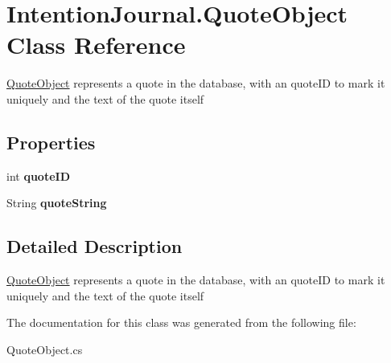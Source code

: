 \hypertarget{class_intention_journal_1_1_quote_object}{}\section{Intention\+Journal.\+Quote\+Object Class Reference}
\label{class_intention_journal_1_1_quote_object}


\hyperlink{class_intention_journal_1_1_quote_object}{Quote\+Object} represents a quote in the database, with an quote\+ID to mark it uniquely and the text of the quote itself  


\subsection*{Properties}
\begin{DoxyCompactItemize}
\item 
\mbox{\label{class_intention_journal_1_1_quote_object_acd7fa876ccb11b2f43ffe8f2616bc7ed}} 
int {\bfseries quote\+ID}
\item 
\mbox{\label{class_intention_journal_1_1_quote_object_a96f7ae5ecf61d428144f66fed8d75933}} 
String {\bfseries quote\+String}
\end{DoxyCompactItemize}


\subsection{Detailed Description}
\hyperlink{class_intention_journal_1_1_quote_object}{Quote\+Object} represents a quote in the database, with an quote\+ID to mark it uniquely and the text of the quote itself 



The documentation for this class was generated from the following file\+:\begin{DoxyCompactItemize}
\item 
Quote\+Object.\+cs\end{DoxyCompactItemize}
